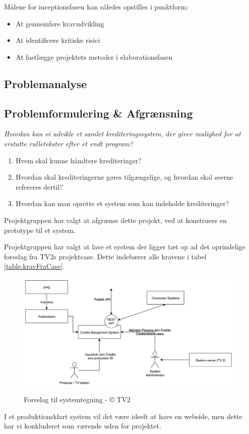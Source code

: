 \noindent
Målene for inceptionsfasen kan således opstilles i punktform:
\begin{itemize}
    \item At gennemføre kravudvikling
    \item At identificere kritiske risici
    \item At fastlægge projektets metoder i elaborationsfasen
\end{itemize}

\subsection{Problemanalyse}


\subsection{Problemformulering \& Afgrænsning}
\textit{Hvordan kan vi udvikle et samlet krediteringssystem, der giver mulighed for at erstatte rulletekster efter et endt program?}

\begin{enumerate}
    \item Hvem skal kunne håndtere krediteringer?
    \item Hvordan skal krediteringerne gøres tilgængelige, og hvordan skal seerne refereres dertil?
    \item Hvordan kan man oprette et system som kan indeholde krediteringer?
\end{enumerate}

\noindent %
Projektgruppen har valgt at afgrænse dette projekt, ved at konstruere en prototype til et system.

\noindent %
Projektgruppen har valgt at lave et system der ligger tæt op ad det oprindelige foreslag fra TV2s projektcase. Dette indebærer alle kravene i tabel \ref{table:kravFraCase}.
\begin{figure}[H]
\centering
\includegraphics[scale=0.3]{figures/tv2_system.png}
\label{fig:tv2_system}
\caption{Foreslag til systemtegning - © TV2}
\end{figure}

\noindent %
I et produktionsklart system vil det være ideelt at have en webside, men dette har vi konkluderet som værende uden for projektet.